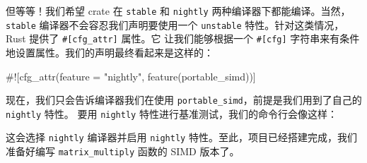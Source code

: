 但等等！我们希望 crate 在 \texttt{stable} 和 \texttt{nightly} 两种编译器下都能编译。当然，\texttt{stable} 编译器不会容忍我们声明要使用一个
\texttt{unstable} 特性。针对这类情况，Rust 提供了 \texttt{\#[\allowbreak{}cfg\_\allowbreak{}attr]\allowbreak{}} 属性。它
让我们能够根据一个 \texttt{\#[cfg]} 字符串来有条件地设置属性。我们的声明最终看起来是这样的：
\begin{codebox}[text]
#![cfg_attr(feature = "nightly", feature(portable_simd))]
\end{codebox}
现在，我们只会告诉编译器我们在使用 \texttt{portable\_\allowbreak{}simd}，前提是我们用到了自己的
\texttt{nightly} 特性。
要用 \texttt{nightly} 特性进行基准测试，我们的命令行会像这样：
\label{idx:idx_b5569870}
这会选择 \texttt{nightly} 编译器并启用 \texttt{nightly} 特性。至此，项目已经搭建完成，我们准备好编写 \texttt{matrix\_\allowbreak{}multiply} 函数的 SIMD 版本了。
